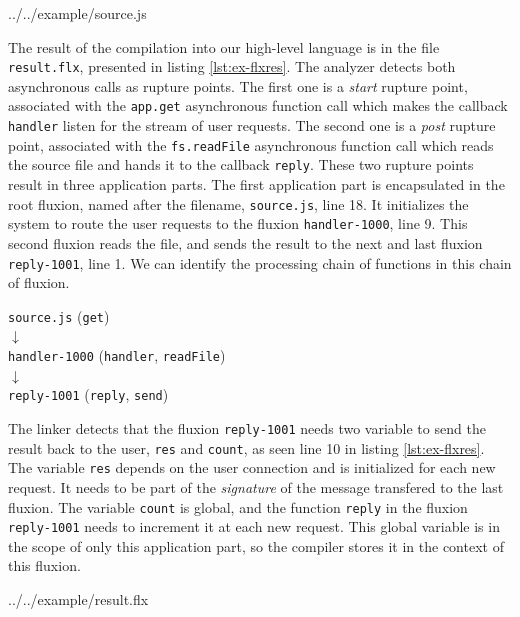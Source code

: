 {../../example/source.js}

The result of the compilation into our high-level language is in the file \texttt{result.flx}, presented in listing \ref{lst:ex-flxres}.
The analyzer detects both asynchronous calls as rupture points.
The first one is a \textit{start} rupture point, associated with the \texttt{app.get} asynchronous function call which makes the callback \texttt{handler} listen for the stream of user requests. 
The second one is a \textit{post} rupture point, associated with the \texttt{fs.readFile} asynchronous function call which reads the source file and hands it to the callback \texttt{reply}.
These two rupture points result in three application parts.
The first application part is encapsulated in the root fluxion, named after the filename, \texttt{source.js}, line 18.
It initializes the system to route the user requests to the fluxion \texttt{handler-1000}, line 9.
This second fluxion reads the file, and sends the result to the next and last fluxion \texttt{reply-1001}, line 1.
We can identify the processing chain of functions in this chain of fluxion.

\begin{center}
\texttt{source.js} (\texttt{get})\\
$\downarrow$\\
\texttt{handler-1000} (\texttt{handler}, \texttt{readFile})\\
$\downarrow$\\
\texttt{reply-1001} (\texttt{reply}, \texttt{send})
\end{center}

The linker detects that the fluxion \texttt{reply-1001} needs two variable to send the result back to the user, \texttt{res} and \texttt{count}, as seen line 10 in listing \ref{lst:ex-flxres}.
The variable \texttt{res} depends on the user connection and is initialized for each new request.
It needs to be part of the \textit{signature} of the message transfered to the last fluxion.
The variable \texttt{count} is global, and the function \texttt{reply} in the fluxion \texttt{reply-1001} needs to increment it at each new request.
This global variable is in the scope of only this application part, so the compiler stores it in the context of this fluxion.

{../../example/result.flx}

